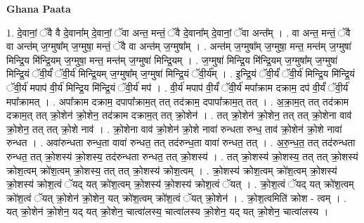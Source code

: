 \documentclass[17pt]{extarticle}
\begin{document}
\textbf{Ghana Paata } \newline

1. दे॒वानां॒ ॅवै वै दे॒वाना᳚म् दे॒वानां॒ ॅवा अन्त॒ मन्तं॒ ॅवै दे॒वाना᳚म् दे॒वानां॒ ॅवा अन्त᳚म् । . वा अन्त॒ मन्तं॒ ॅवै वा अन्त॑म् ज॒ग्मुषा᳚म् ज॒ग्मुषा॒ मन्तं॒ ॅवै वा अन्त॑म् ज॒ग्मुषा᳚म् । . अन्त॑म् ज॒ग्मुषा᳚म् ज॒ग्मुषा॒ मन्त॒ मन्त॑म् ज॒ग्मुषा॑ मिन्द्रि॒य मि॑न्द्रि॒यम् ज॒ग्मुषा॒ मन्त॒ मन्त॑म् ज॒ग्मुषा॑ मिन्द्रि॒यम् । . ज॒ग्मुषा॑ मिन्द्रि॒य मि॑न्द्रि॒यम् ज॒ग्मुषा᳚म् ज॒ग्मुषा॑ मिन्द्रि॒यं ॅवी॒र्यं॑ ॅवी॒र्य॑ मिन्द्रि॒यम् ज॒ग्मुषा᳚म् ज॒ग्मुषा॑ मिन्द्रि॒यं ॅवी॒र्य᳚म् । . इ॒न्द्रि॒यं ॅवी॒र्यं॑ ॅवी॒र्य॑ मिन्द्रि॒य मि॑न्द्रि॒यं ॅवी॒र्य॑ मपाप॑ वी॒र्य॑ मिन्द्रि॒य मि॑न्द्रि॒यं ॅवी॒र्य॑ मप॑ । . वी॒र्य॑ मपाप॑ वी॒र्यं॑ ॅवी॒र्य॑ मपा᳚क्राम दक्राम॒ दप॑ वी॒र्यं॑ ॅवी॒र्य॑ मपा᳚क्रामत् । . अपा᳚क्राम दक्राम॒ दपापा᳚क्राम॒त् तत् तद॑क्राम॒ दपापा᳚क्राम॒त् तत् । . अ॒क्रा॒म॒त् तत् तद॑क्राम दक्राम॒त् तत् क्रो॒शेन॑ क्रो॒शेन॒ तद॑क्राम दक्राम॒त् तत् क्रो॒शेन॑ । . तत् क्रो॒शेन॑ क्रो॒शेन॒ तत् तत् क्रो॒शेना वाव॑ क्रो॒शेन॒ तत् तत् क्रो॒शे नाव॑ । . क्रो॒शेना वाव॑ क्रो॒शेन॑ क्रो॒शे नावा॑ रुन्धता रुन्ध॒ ताव॑ क्रो॒शेन॑ क्रो॒शे नावा॑ रुन्धत । . अवा॑रुन्धता रुन्ध॒ता वावा॑ रुन्धत॒ तत् तद॑रुन्ध॒ता वावा॑ रुन्धत॒ तत् । . अ॒रु॒न्ध॒त॒ तत् तद॑रुन्धता रुन्धत॒ तत् क्रो॒शस्य॑ क्रो॒शस्य॒ तद॑रुन्धता रुन्धत॒ तत् क्रो॒शस्य॑ । . तत् क्रो॒शस्य॑ क्रो॒शस्य॒ तत् तत् क्रो॒शस्य॑ क्रोश॒त्वम् क्रो॑श॒त्वम् क्रो॒शस्य॒ तत् तत् क्रो॒शस्य॑ क्रोश॒त्वम् । . क्रो॒शस्य॑ क्रोश॒त्वम् क्रो॑श॒त्वम् क्रो॒शस्य॑ क्रो॒शस्य॑ क्रोश॒त्वं ॅयद् यत् क्रो॑श॒त्वम् क्रो॒शस्य॑ क्रो॒शस्य॑ क्रोश॒त्वं ॅयत् । . क्रो॒श॒त्वं ॅयद् यत् क्रो॑श॒त्वम् क्रो॑श॒त्वं ॅयत् क्रो॒शेन॑ क्रो॒शेन॒ यत् क्रो॑श॒त्वम् क्रो॑श॒त्वं ॅयत् क्रो॒शेन॑ । . क्रो॒श॒त्वमिति॑ क्रोश - त्वम् । . यत् क्रो॒शेन॑ क्रो॒शेन॒ यद् यत् क्रो॒शेन॒ चात्वा॑लस्य॒ चात्वा॑लस्य क्रो॒शेन॒ यद् यत् क्रो॒शेन॒ चात्वा॑लस्य । \newline
\end{document}
